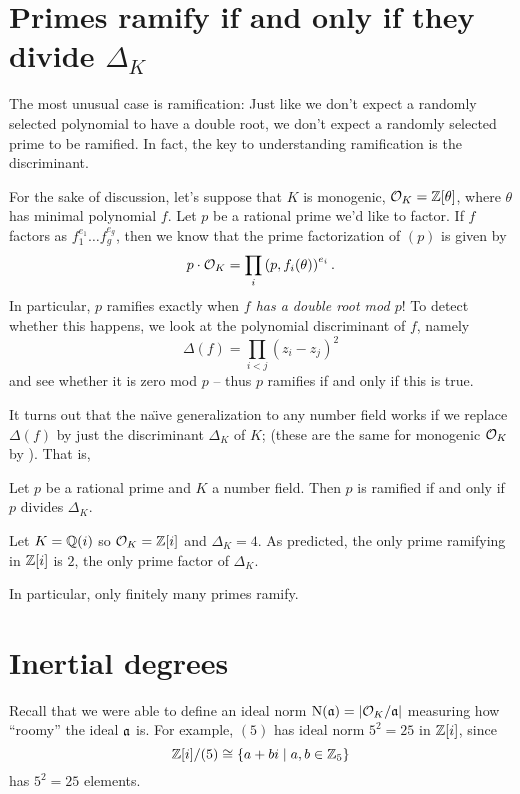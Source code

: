 \section{Primes ramify if and only if they divide $\Delta_K$}
The most unusual case is ramification:
Just like we don't expect a randomly selected polynomial to have a double root,
we don't expect a randomly selected prime to be ramified.
In fact, the key to understanding ramification is the discriminant.

For the sake of discussion, let's suppose that $K$ is monogenic,
$\OO_K = \ZZ[\theta]$, where $\theta$ has minimal polynomial $f$.
Let $p$ be a rational prime we'd like to factor.
If $f$ factors as $f_1^{e_1} \dots f_g^{e_g}$, then we know that
the prime factorization of $(p)$ is given by
\[ p \cdot \OO_K = \prod_i \left( p, f_i(\theta) \right)^{e_i}. \]
In particular, $p$ ramifies exactly when \emph{$f$ has a double root mod $p$}!
To detect whether this happens, we look at the polynomial discriminant of $f$,
namely
\[ \Delta(f) = \prod_{i<j} (z_i - z_j)^2 \]
and see whether it is zero mod $p$ -- thus $p$ ramifies if and only if this is true.

It turns out that the na\"{\i}ve generalization to any number field
works if we replace $\Delta(f)$ by just the discriminant $\Delta_K$ of $K$;
(these are the same for monogenic $\OO_K$ by ).
That is,
\begin{theorem}
	Let $p$ be a rational prime and $K$ a number field.
	Then $p$ is ramified if and only if $p$ divides $\Delta_K$.
\end{theorem}
\begin{example}
	Let $K = \QQ(i)$ so $\OO_K = \ZZ[i]$ and $\Delta_K = 4$.
	As predicted, the only prime ramifying in $\ZZ[i]$ is $2$,
	the only prime factor of $\Delta_K$.
\end{example}
In particular, only finitely many primes ramify.

\section{Inertial degrees}

Recall that we were able to define an ideal norm
$\Norm(\aa) = \left\lvert \OO_K / \aa \right\rvert$
measuring how ``roomy'' the ideal $\aa$ is.
For example, $(5)$ has ideal norm $5^2 = 25$ in $\ZZ[i]$, since
\[ \ZZ[i] / (5) \cong \left\{ a+bi \mid a,b \in \Zc5 \right\} \]
has $5^2 = 25$ elements.


